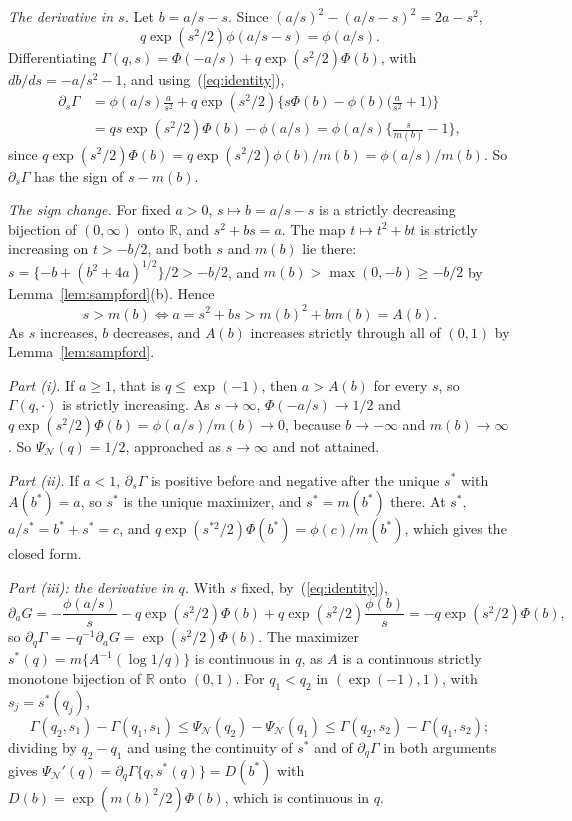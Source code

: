\documentclass[12pt]{article}
\renewcommand{\_}{\usc\allowbreak}
\theoremstyle{definition}
\numberwithin{equation}{section}
\newcommand{\N}{\mathcal{N}}
\begin{document}
\emph{The derivative in $s$.} Let $b = a/s - s$. Since $(a/s)^2 - (a/s - s)^2 = 2a - s^2$,
\begin{equation}\label{eq:identity}
q\exp(s^2/2)\phi(a/s - s) = \phi(a/s).
\end{equation}
Differentiating $\Gamma(q, s) = \Phi(-a/s) + q\exp(s^2/2)\Phi(b)$, with $db/ds = -a/s^2 - 1$, and using~(\ref{eq:identity}),
\begin{align*}
\partial_s\Gamma &= \phi(a/s)\frac{a}{s^2} + q\exp(s^2/2)\Big\{s\Phi(b) - \phi(b)\Big(\frac{a}{s^2} + 1\Big)\Big\} \\
&= qs\exp(s^2/2)\Phi(b) - \phi(a/s) = \phi(a/s)\Big\{\frac{s}{m(b)} - 1\Big\},
\end{align*}
since $q\exp(s^2/2)\Phi(b) = q\exp(s^2/2)\phi(b)/m(b) = \phi(a/s)/m(b)$. So $\partial_s\Gamma$ has the sign of $s - m(b)$.

\emph{The sign change.} For fixed $a > 0$, $s \mapsto b = a/s - s$ is a strictly decreasing bijection of $(0, \infty)$ onto $\mathbb R$, and $s^2 + bs = a$. The map $t \mapsto t^2 + bt$ is strictly increasing on $t > -b/2$, and both $s$ and $m(b)$ lie there: $s = \{-b + (b^2 + 4a)^{1/2}\}/2 > -b/2$, and $m(b) > \max(0, -b) \ge -b/2$ by Lemma~\ref{lem:sampford}(b). Hence
\[
s > m(b) \iff a = s^2 + bs > m(b)^2 + bm(b) = A(b).
\]
As $s$ increases, $b$ decreases, and $A(b)$ increases strictly through all of $(0, 1)$ by Lemma~\ref{lem:sampford}.

\emph{Part (i).} If $a \ge 1$, that is $q \le \exp(-1)$, then $a > A(b)$ for every $s$, so $\Gamma(q, \cdot)$ is strictly increasing. As $s \to \infty$, $\Phi(-a/s) \to 1/2$ and $q\exp(s^2/2)\Phi(b) = \phi(a/s)/m(b) \to 0$, because $b \to -\infty$ and $m(b) \to \infty$. So $\Psi_{\N}(q) = 1/2$, approached as $s \to \infty$ and not attained.

\emph{Part (ii).} If $a < 1$, $\partial_s\Gamma$ is positive before and negative after the unique $s^*$ with $A(b^*) = a$, so $s^*$ is the unique maximizer, and $s^* = m(b^*)$ there. At $s^*$, $a/s^* = b^* + s^* = c$, and $q\exp(s^{*2}/2)\Phi(b^*) = \phi(c)/m(b^*)$, which gives the closed form.

\emph{Part (iii): the derivative in $q$.} With $s$ fixed, by~(\ref{eq:identity}),
\[
\partial_aG = -\frac{\phi(a/s)}{s} - q\exp(s^2/2)\Phi(b) + q\exp(s^2/2)\frac{\phi(b)}{s} = -q\exp(s^2/2)\Phi(b),
\]
so $\partial_q\Gamma = -q^{-1}\partial_aG = \exp(s^2/2)\Phi(b)$. The maximizer $s^*(q) = m\{A^{-1}(\log 1/q)\}$ is continuous in $q$, as $A$ is a continuous strictly monotone bijection of $\mathbb R$ onto $(0, 1)$. For $q_1 < q_2$ in $(\exp(-1), 1)$, with $s_j = s^*(q_j)$,
\[
\Gamma(q_2, s_1) - \Gamma(q_1, s_1) \le \Psi_{\N}(q_2) - \Psi_{\N}(q_1) \le \Gamma(q_2, s_2) - \Gamma(q_1, s_2);
\]
dividing by $q_2 - q_1$ and using the continuity of $s^*$ and of $\partial_q\Gamma$ in both arguments gives $\Psi_{\N}'(q) = \partial_q\Gamma\{q, s^*(q)\} = D(b^*)$ with $D(b) = \exp(m(b)^2/2)\Phi(b)$, which is continuous in $q$.
\end{document}
